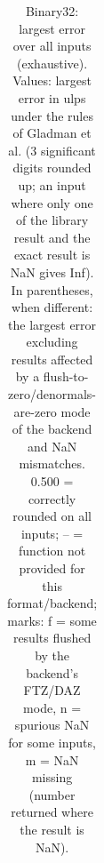 \begin{table}
\begin{small}
\begin{tabular}{|l|cccc|cccc|cc|c|}
\hline
\end{tabular}
\end{small}
\caption{Binary32: largest error over all inputs (exhaustive). Values: largest error in ulps under the rules of Gladman et al. (3 significant digits rounded up; an input where only one of the library result and the exact result is NaN gives Inf). In parentheses, when different: the largest error excluding results affected by a flush-to-zero/denormals-are-zero mode of the backend and NaN mismatches. 0.500 = correctly rounded on all inputs; -- = function not provided for this format/backend; marks: f = some results flushed by the backend's FTZ/DAZ mode, n = spurious NaN for some inputs, m = NaN missing (number returned where the result is NaN). }
\label{tab:b32}
\end{table}
